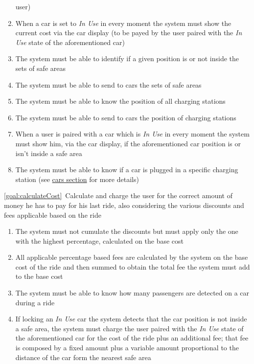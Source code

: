 \begin{description}
\begin{enumerate}[resume*]
  				user)
  				\item When a car is set to \emph{In Use} in every moment the system must show the
  				current cost via the car display (to be payed by the user paired with the \emph{In Use}
  				state of the aforementioned car) 
  				\item The system must be able to identify if a given position is or not inside the sets
  				of safe areas
  				\item The system must be able to send to cars the sets of safe areas
  				\item The system must be able to know the position of all charging stations
  				\item The system must be able to send to cars the position of charging stations
  				\item When a user is paired with a car which is \emph{In Use} in every moment the
  				system must show him, via the car display, if the aforementioned car position is or
  				isn't inside a safe area
  				\item The system must be able to know if a car is plugged in a specific charging
  				station (see \hyperref[sec:cars]{cars section} for more details)
   			\end{enumerate}
  		\item \ref{goal:calculateCost}\ Calculate and charge the user for the correct amount of money he has to pay for his last ride, also considering the various discounts and fees applicable based on the ride
  			\begin{enumerate}[resume*]
  			    \item The system must not cumulate the discounts but must apply only the one with
  			    the highest percentage, calculated on the base cost
  			    \item All applicable percentage based fees are calculated by the system on the base cost of the ride and then summed to obtain the total fee the system must add to the base cost
  			    \item The system must be able to know how many passengers are detected on a car
  			    during a ride	
  				\item If locking an \emph{In Use} car the system detects that the car position is not
  				inside a safe area, the system must charge the user paired with the \emph{In Use}
  				state of the aforementioned car for the cost of the ride plus an additional fee; that fee
  				is composed by a fixed amount plus a variable amount proportional to the distance of
  				the car form the nearest safe area

\end{enumerate}
\end{description}
